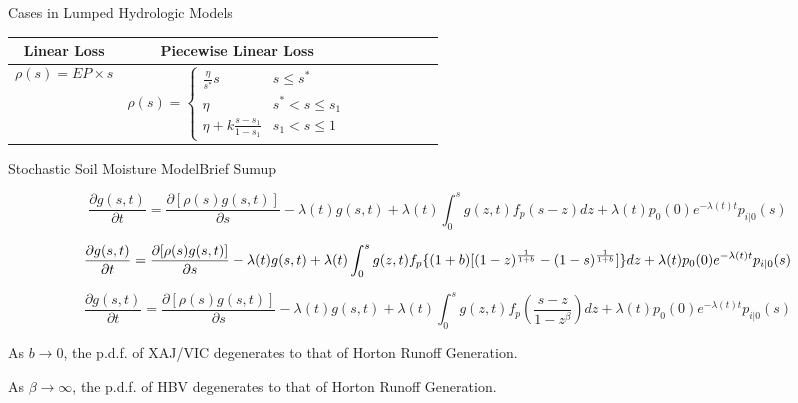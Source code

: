 \documentclass[10pt]{beamer}
\begin{document}
\begin{frame}{Cases in Lumped Hydrologic Models}
 \begin{table}
\begin{tabular}{cccccccc}
\hline 
Linear Loss&Piecewise Linear Loss\\ 
\hline 
 \begin{equation*}
\label{linearep}
\rho (s)=EP \times s
\end{equation*}
&
 \begin{equation*}
\rho (s )=
 \begin{cases}
 \frac{\eta}{s^*} s  &s\leq s^{*}\\ 
 \eta &s^*<s\leq s_1\\
 \eta+k\frac{s-s_1}{1-s_1} &s_1<s\leq 1
 \end{cases}
 \end{equation*}\\
\hline 
\end{tabular}
\end{table}
\end{frame}

\begin{frame}{Stochastic Soil Moisture Model}{Brief Sumup}
{
 
\begin{scriptsize}
\begin{equation*} 
\label{ssd}
\frac{\partial{g(s,t)}}{\partial t}=\frac{\partial{[\rho(s)g(s,t)]}}{\partial s}-\lambda(t)g(s,t)+\lambda(t)\int_{0}^{s} g(z,t)f_{p}(s-z)dz+\lambda(t)p_0(0)e^{-\lambda(t) t}p_{i|0}(s)
\end{equation*}
\end{scriptsize}

\begin{tiny}
\begin{equation*}\small
\label{ssm}
\frac{\partial{g(s,t)}}{\partial t}=\frac{\partial{[\rho(s)g(s,t)]}}{\partial s}-\lambda(t)g(s,t)+\lambda(t)\int_{0}^{s} g(z,t)f_{p}\{(1+b) [(1-z)^{\frac{1}{1+b}}-(1-s)^{\frac{1}{1+b}} ] \}dz+\lambda(t)p_0(0)e^{-\lambda(t) t}p_{i|0}(s)
\end{equation*}
\end{tiny}

\begin{scriptsize}
\begin{equation*} 
\label{ssd}
\frac{\partial{g(s,t)}}{\partial t}=\frac{\partial{[\rho(s)g(s,t)]}}{\partial s}-\lambda(t)g(s,t)+\lambda(t)\int_{0}^{s} g(z,t)f_{p}(\frac{s-z}{1-z^{\beta}})dz+\lambda(t)p_0(0)e^{-\lambda(t) t}p_{i|0}(s)
\end{equation*}
\end{scriptsize}
}


As \textcolor[rgb]{1,0,0}{$b  \rightarrow 0$}, the p.d.f. of XAJ/VIC degenerates to that of Horton Runoff Generation.
 
 
As \textcolor[rgb]{1,0,0}{$\beta   \rightarrow \infty$}, the p.d.f. of HBV degenerates to that of Horton Runoff Generation.
\end{frame}
\end{document}
